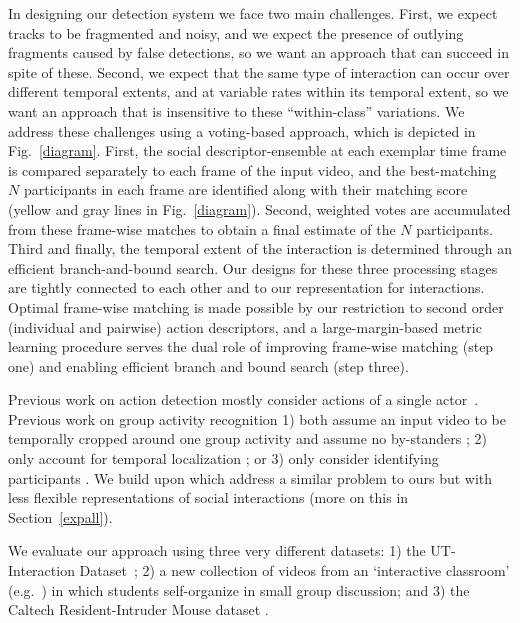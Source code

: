 In designing our detection system we face two main challenges. First, we expect tracks to be fragmented and noisy, and we expect the presence of outlying fragments caused by false detections, so we want an approach that can succeed in spite of these. Second, we expect that the same type of interaction can occur over different temporal extents, and at variable rates within its temporal extent, so we want an approach that is insensitive to these ``within-class'' variations. We address these challenges using a voting-based approach, which is depicted in Fig.~\ref{diagram}. First, the social descriptor-ensemble at each exemplar time frame is compared separately to each frame of the input video, and the best-matching $N$ participants in each frame are identified along with their matching score (yellow and gray lines in Fig.~\ref{diagram}). Second, weighted votes are accumulated from these frame-wise matches to obtain a final estimate of the $N$ participants. Third and finally, the temporal extent of the interaction is determined through an efficient branch-and-bound search. Our designs for these three processing stages are tightly connected to each other and to our representation for interactions. Optimal frame-wise matching is made possible by our restriction to second order (individual and pairwise) action descriptors, and a large-margin-based metric learning procedure serves the dual role of improving frame-wise matching (step one) and enabling efficient branch and bound search (step three).

Previous work on action detection mostly consider actions of a single actor~\cite{Ke:detection,Yuan:detection,Shechtman:detection,Hu:detection,Laptev:detection,Duchenne:detection}. Previous work on group activity recognition 1) both assume an input video to be temporally cropped around one group activity and assume no by-standers \cite{Intille:act,Ni:group,Lan:Group}; 2) only account for temporal localization \cite{Hongeng:act,Gong:act,Hakeem:act,McCowan:meeting,Choi:recogtrack,Vlad:group, Ryoo:group, CRIM13}; or 3) only consider identifying participants \cite{Li:segmentation,Cristani:discovery}. We build upon \cite{Amer:group} which address a similar problem to ours but with less flexible representations of social interactions (more on this in Section~\ref{expall}). 

We evaluate our approach using three very different datasets: 1) the UT-Interaction Dataset~\cite{Ryoo:group}; 2) a new collection of videos from an `interactive classroom' (e.g.~\cite{Crouch:PI}) in which students self-organize in small group discussion; and 3) the Caltech Resident-Intruder Mouse dataset \cite{CRIM13}.



